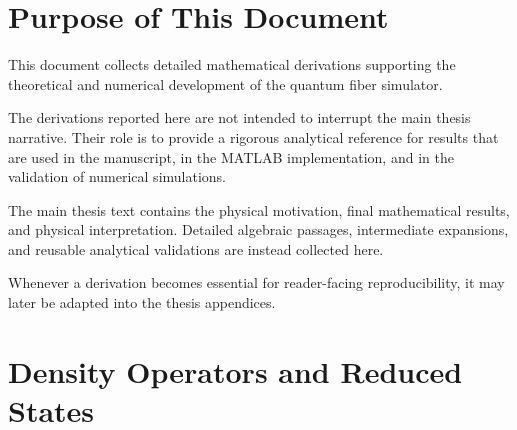 \documentclass[a4paper,12pt]{report}
\begin{document}
\maketitle


\chapter{Purpose of This Document}

This document collects detailed mathematical derivations supporting the theoretical and numerical development of the quantum fiber simulator.

The derivations reported here are not intended to interrupt the main thesis narrative. Their role is to provide a rigorous analytical reference for results that are used in the manuscript, in the MATLAB implementation, and in the validation of numerical simulations.

\medskip

The main thesis text contains the physical motivation, final mathematical results, and physical interpretation. Detailed algebraic passages, intermediate expansions, and reusable analytical validations are instead collected here.

\medskip

Whenever a derivation becomes essential for reader-facing reproducibility, it may later be adapted into the thesis appendices.

\tableofcontents


\chapter{Density Operators and Reduced States}





\end{document}

